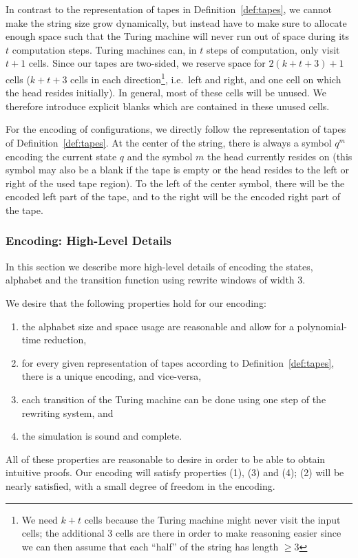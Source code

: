 \documentclass[a4paper,UKenglish,cleveref, autoref]{lipics-v2019}
\begin{document}
In contrast to the representation of tapes in Definition~\ref{def:tapes}, we cannot make the string size grow dynamically, but instead have to make sure to allocate enough space such that the Turing machine will never run out of space during its $t$ computation steps. Turing machines can, in $t$ steps of computation, only visit $t+1$ cells. Since our tapes are two-sided, we reserve space for $2(k + t + 3)+1$ cells ($k + t + 3$ cells in each direction\footnote{We need $k+t$ cells because the Turing machine might never visit the input cells; the additional 3 cells are there in order to make reasoning easier since we can then assume that each ``half'' of the string has length $\ge 3$}, i.e.\ left and right, and one cell on which the head resides initially).
In general, most of these cells will be unused. We therefore introduce explicit blanks \blank{} which are contained in these unused cells.

For the encoding of configurations, we directly follow the representation of tapes of Definition~\ref{def:tapes}.
At the center of the string, there is always a symbol $q^m$ encoding the current state $q$ and the symbol $m$ the head currently resides on (this symbol may also be a blank \blank{} if the tape is empty or the head resides to the left or right of the used tape region). 
To the left of the center symbol, there will be the encoded left part of the tape, and to the right will be the encoded right part of the tape. 

\newcommand{\polneg}[1]{\overleftarrow{#1}}
\newcommand{\polpos}[1]{\overrightarrow{#1}}
\newcommand{\polneut}[1]{\overline{#1}}
\subsubsection{Encoding: High-Level Details}\label{sec:rewrules}
In this section we describe more high-level details of encoding the states, alphabet and the transition function using rewrite windows of width 3. 

We desire that the following properties hold for our encoding:
\begin{enumerate}
  \item the alphabet size and space usage are reasonable and allow for a polynomial-time reduction,
  \item for every given representation of tapes according to Definition~\ref{def:tapes}, there is a unique encoding, and vice-versa,
  \item each transition of the Turing machine can be done using one step of the rewriting system, and
  \item the simulation is sound and complete.
\end{enumerate}
All of these properties are reasonable to desire in order to be able to obtain intuitive proofs.
Our encoding will satisfy properties (1), (3) and (4); (2) will be nearly satisfied, with a small degree of freedom in the encoding.
\end{document}
